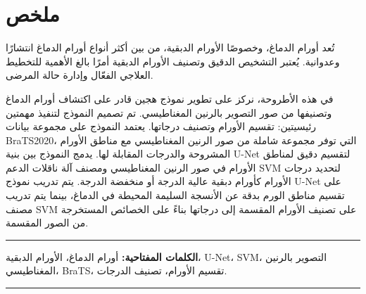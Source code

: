 \chapter*{\hfill  ملخص \hfill}

تُعد أورام الدماغ، وخصوصًا الأورام الدبقية، من بين أكثر أنواع أورام الدماغ انتشارًا وعدوانية. يُعتبر التشخيص الدقيق وتصنيف الأورام الدبقية أمرًا بالغ الأهمية للتخطيط العلاجي الفعّال وإدارة حالة المرضى.

في هذه الأطروحة، نركز على تطوير نموذج هجين قادر على اكتشاف أورام الدماغ وتصنيفها من صور التصوير بالرنين المغناطيسي. تم تصميم النموذج لتنفيذ مهمتين رئيسيتين: تقسيم الأورام وتصنيف درجاتها. يعتمد النموذج على مجموعة بيانات \textenglish{BraTS2020}، التي توفر مجموعة شاملة من صور الرنين المغناطيسي مع مناطق الأورام المشروحة والدرجات المقابلة لها. يدمج النموذج بين بنية \textenglish{U-Net} لتقسيم دقيق لمناطق الأورام في صور الرنين المغناطيسي ومصنف آلة ناقلات الدعم \textenglish{SVM} لتحديد درجات الأورام كأورام دبقية عالية الدرجة أو منخفضة الدرجة. يتم تدريب نموذج \textenglish{U-Net} على تقسيم مناطق الورم بدقة عن الأنسجة السليمة المحيطة في الدماغ، بينما يتم تدريب مصنف \textenglish{SVM} على تصنيف الأورام المقسمة إلى درجاتها بناءً على الخصائص المستخرجة من الصور المقسمة.

\noindent\rule{\textwidth}{0.2pt}
\textbf{الكلمات المفتاحية:} أورام الدماغ، الأورام الدبقية، \textenglish{U-Net}، \textenglish{SVM}، التصوير بالرنين المغناطيسي، \textenglish{BraTS}، تقسيم الأورام، تصنيف الدرجات.\\
\noindent\rule{\textwidth}{0.2pt}
